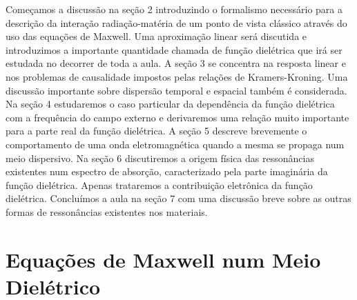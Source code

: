 \documentclass{article}
\begin{document}
Começamos a discussão na seção 2 introduzindo o formalismo necessário para a descrição da interação radiação-matéria de um ponto de vista clássico através do uso das equações de Maxwell. Uma aproximação linear será discutida e introduzimos a importante quantidade chamada de função dielétrica que irá ser estudada no decorrer de toda a aula. A seção 3 se concentra na resposta linear e nos problemas de causalidade impostos pelas relações de Kramers-Kroning. Uma discussão importante sobre dispersão temporal e espacial também é considerada. Na seção 4 estudaremos o caso particular da dependência da função dielétrica com a frequência do campo externo e derivaremos uma relação muito importante para a parte real da função dielétrica. A seção 5 descreve brevemente o comportamento de uma onda eletromagnética quando a mesma se propaga num meio dispersivo. Na seção 6 discutiremos a origem física das ressonâncias existentes num espectro de absorção, caracterizado pela parte imaginária da função dielétrica. Apenas trataremos a contribuição eletrônica da função dielétrica. Concluímos a aula na seção 7 com uma discussão breve sobre as outras formas de ressonâncias existentes nos materiais.


\section{Equações de Maxwell num Meio Dielétrico}
\end{document}
